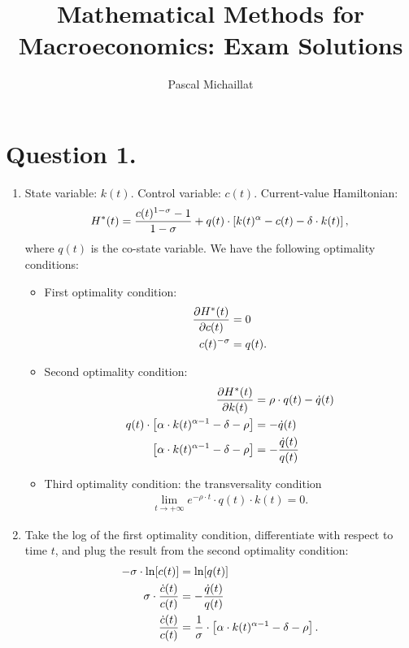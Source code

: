 \documentclass[letterpaper,12pt,leqno]{article}
\begin{document}
\title{Mathematical Methods for Macroeconomics: Exam Solutions}
\author{Pascal Michaillat}
\date{}

\begin{titlepage}
\maketitle
\end{titlepage}


\section*{Question 1.}

\begin{enumerate}
\item State variable: $k(t)$. Control variable: $c(t)$. Current-value Hamiltonian:
\[H^{*}(t)=\frac{c(t)^{1-\sigma}-1}{1-\sigma} +q(t)\cdot \left[k(t)^{\alpha}-c(t)-\delta \cdot k(t)\right],\]
where $q(t)$ is the co-state variable. We have the following optimality conditions:

\begin{itemize}

\item First optimality condition:
\begin{align*}
\frac{\partial H^{*}(t)}{\partial c(t)}&=0\\
c(t)^{-\sigma}&=q(t).
\end{align*}

\item Second optimality condition:
\begin{align*}
\frac{\partial H^{*}(t)}{\partial k(t)}&=\rho\cdot q(t)-\dot{q}(t)\\
q(t)\cdot \left[\alpha\cdot k(t)^{\alpha-1}-\delta -\rho\right]&=-\dot{q}(t)\\
\left[\alpha\cdot k(t)^{\alpha-1}-\delta -\rho\right]&=-\frac{\dot{q}(t)}{q(t)}\\
\end{align*}

\item Third optimality condition: the transversality condition
\begin{align*}
\lim_{t\to +\infty} e^{-\rho\cdot t}\cdot q(t)\cdot k(t)=0.
\end{align*}

\end{itemize}

\item Take the log of the first optimality condition, differentiate with respect to time $t$, and plug the result from the second optimality condition:
\begin{align*}
-\s\cdot \ln [c(t)]&=\ln[q(t)]\\
\s\cdot \frac{\dot{c}(t)}{c(t)}&=-\frac{\dot{q}(t)}{q(t)}\\
\frac{\dot{c}(t)}{c(t)}&=\frac{1}{\s}\cdot \left[\a\cdot k(t)^{\a-1}-\d -\rho\right].
\end{align*}



\end{enumerate}
\end{document}
